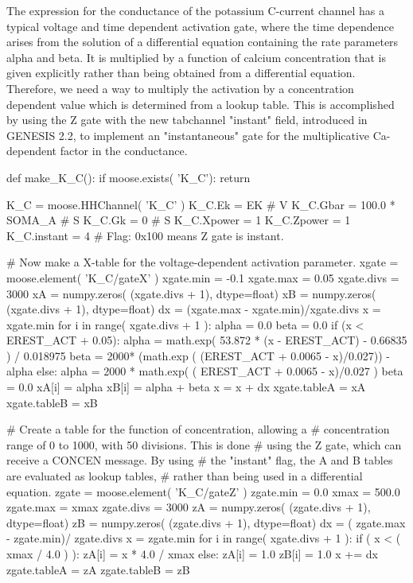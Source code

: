 \documentclass[]{article}%
\begin{document}
  The expression for the conductance of the potassium C-current channel has a
  typical voltage and time dependent activation gate, where the time dependence
  arises from the solution of a differential equation containing the rate
  parameters alpha and beta.  It is multiplied by a function of calcium
  concentration that is given explicitly rather than being obtained from a
  differential equation.  Therefore, we need a way to multiply the activation by
  a concentration dependent value which is determined from a lookup table.  This
  is accomplished by using the Z gate with the new tabchannel "instant" field,
  introduced in GENESIS 2.2, to implement an "instantaneous" gate for the
  multiplicative Ca-dependent factor in the conductance.

\nwenddocs{}\endmoddef\nwstartdeflinemarkup{}\nwenddeflinemarkup
def make_K_C():
  if moose.exists( 'K_C'):
    return

  K_C = moose.HHChannel( 'K_C' )
  K_C.Ek = EK          #  V
  K_C.Gbar = 100.0 * SOMA_A   #  S
  K_C.Gk = 0          #  S
  K_C.Xpower = 1
  K_C.Zpower = 1
  K_C.instant = 4        # Flag: 0x100 means Z gate is instant.

  # Now make a X-table for the voltage-dependent activation parameter.
  xgate = moose.element( 'K_C/gateX' )
  xgate.min = -0.1
  xgate.max = 0.05
  xgate.divs = 3000
  xA = numpy.zeros( (xgate.divs + 1), dtype=float)
  xB = numpy.zeros( (xgate.divs + 1), dtype=float)
  dx = (xgate.max - xgate.min)/xgate.divs
  x = xgate.min
  for i in range( xgate.divs + 1 ):
    alpha = 0.0
    beta = 0.0
    if (x < EREST_ACT + 0.05):
      alpha = math.exp( 53.872 * (x - EREST_ACT) - 0.66835 ) / 0.018975
      beta = 2000* (math.exp ( (EREST_ACT + 0.0065 - x)/0.027)) - alpha
    else:
      alpha = 2000 * math.exp( ( EREST_ACT + 0.0065 - x)/0.027 )
      beta = 0.0
    xA[i] = alpha
    xB[i] = alpha + beta
    x = x + dx
  xgate.tableA = xA
  xgate.tableB = xB

    # Create a table for the function of concentration, allowing a
    # concentration range of 0 to 1000, with 50 divisions.  This is done
    # using the Z gate, which can receive a CONCEN message.  By using
    # the "instant" flag, the A and B tables are evaluated as lookup tables,
    #  rather than being used in a differential equation.
  zgate = moose.element( 'K_C/gateZ' )
  zgate.min = 0.0
  xmax = 500.0
  zgate.max = xmax
  zgate.divs = 3000
  zA = numpy.zeros( (zgate.divs + 1), dtype=float)
  zB = numpy.zeros( (zgate.divs + 1), dtype=float)
  dx = ( zgate.max -  zgate.min)/ zgate.divs
  x = zgate.min
  for i in range( xgate.divs + 1 ):
    if ( x < ( xmax / 4.0 ) ):
      zA[i] = x * 4.0 / xmax
    else:
      zA[i] = 1.0
    zB[i] = 1.0
    x += dx
  zgate.tableA = zA
  zgate.tableB = zB
   
\end{document}
